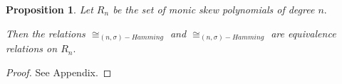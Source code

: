 \documentclass[12pt,paper]{article}
\newcommand{\hlc}[2][yellow]{ {\sethlcolor{#1} \hl{#2}} }
\theoremstyle{plain}
\newtheorem{proposition}[theorem]{Proposition}
\newcommand{\Fq}{\mathbb{F}_{q}}
\begin{document}
\begin{proposition}\label{ProofEquiv}
Let $ R_{ n}$ be the set of monic skew polynomials of degree $n.$ 

Then the relations $\cong_{(n,\sigma)-Hamming}$ and  $\cong_{(n,\sigma)-Hamming}$  are equivalence relations on $ R_{n}.$ 
\end{proposition}
\begin{proof}
    See Appendix.
\end{proof}





 

\end{document}
